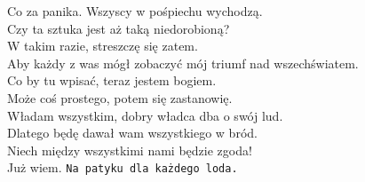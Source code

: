 \charszam{}
Co za panika. Wszyscy w pośpiechu wychodzą.\\
Czy ta sztuka jest aż taką niedorobioną?\\
W takim razie, streszczę się zatem.\\
Aby każdy z was mógł zobaczyć mój triumf nad wszechświatem.\\
Co by tu wpisać, teraz jestem bogiem.\\
Może coś prostego, potem się zastanowię.\\
Władam wszystkim, dobry władca dba o swój lud.\\
Dlatego będę dawał wam wszystkiego w bród.\\
Niech między wszystkimi nami będzie zgoda!\\
Już wiem. \texttt{Na patyku dla każdego loda.}\\













